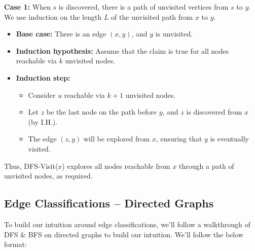    \begin{Proof}

        \textbf{Case 1:} When $s$ is discovered, there is a path of unvisited vertices from $s$ to $y$. We use induction on the length $L$ of the unvisited path from $x$ to $y$.
        \begin{itemize}
            \item \textbf{Base case:} There is an edge $(x, y)$, and $y$ is unvisited.
            \item \textbf{Induction hypothesis:} Assume that the claim is true for all nodes reachable via $k$ unvisited nodes.
            \item \textbf{Induction step:}
            \begin{itemize}
                \item Consider $u$ reachable via $k + 1$ unvisited nodes.
                \item Let $z$ be the last node on the path before $y$, and $z$ is discovered from $x$ (by I.H.).
                \item The edge $(z, y)$ will be explored from $x$, ensuring that $y$ is eventually visited.
            \end{itemize}
        \end{itemize}
        \noindent
        Thus, DFS-Visit($x$) explores all nodes reachable from $x$ through a path of unvisited nodes, as required.
        \end{Proof}

    
\subsection{Edge Classifications -- Directed Graphs}

\noindent
To build our intuition around edge classifications, we'll follow a walkthrough of DFS \& BFS on directed graphs
to build our intuition. We'll follow the below format:

